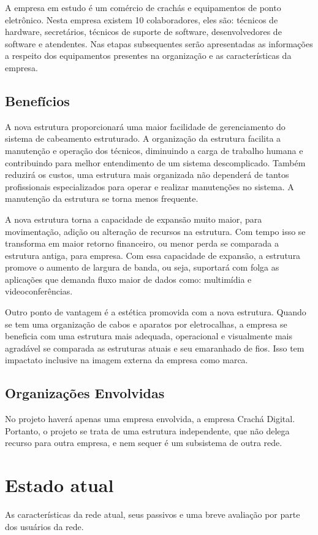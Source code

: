 \documentclass[	DIV=calc,%
							paper=a4,%
							fontsize=12pt,%
							onecolumn]{scrartcl}	 					%
\begin{document}
A empresa em estudo é um comércio de crachás e equipamentos de ponto eletrônico. Nesta empresa existem 10 colaboradores, eles são: técnicos de hardware, secretários, técnicos de suporte de software, desenvolvedores de software e atendentes. Nas etapas subsequentes serão apresentadas as informações a respeito dos equipamentos presentes na organização e as características da empresa.

\subsection{Benefícios}

A nova estrutura proporcionará uma maior facilidade de gerenciamento do sistema de cabeamento estruturado. A organização da estrutura facilita a manutenção e operação dos técnicos, diminuindo a carga de trabalho humana e contribuindo para melhor entendimento de um sistema descomplicado.
Também reduzirá os custos, uma estrutura mais organizada não dependerá de tantos profissionais especializados para operar e realizar manutenções no sistema. A manutenção da estrutura se torna menos frequente.
 
A nova estrutura torna a capacidade de expansão muito maior, para movimentação, adição ou alteração de recursos na estrutura. Com tempo isso se transforma em maior retorno financeiro, ou menor perda se comparada a estrutura antiga, para empresa. Com essa capacidade de expansão, a estrutura promove o aumento de largura de banda, ou seja, suportará com folga as aplicações que demanda fluxo maior de dados como: multimídia e videoconferências.

Outro ponto de vantagem é a estética promovida com a nova estrutura. Quando se tem uma organização de cabos e aparatos por eletrocalhas, a empresa se beneficia com uma estrutura mais adequada, operacional e visualmente mais agradável se comparada as estruturas atuais e seu emaranhado de fios. Isso tem impactato inclusive na imagem externa da empresa como marca.

\subsection{Organizações Envolvidas}
No projeto haverá apenas uma empresa envolvida, a empresa Crachá Digital. Portanto, o projeto se trata de uma estrutura independente, que não delega recurso para outra empresa, e nem sequer é um subsistema de outra rede.



\section{Estado atual}
As características da rede atual, seus passivos e uma breve avaliação por parte dos usuários da rede.
\end{document}
